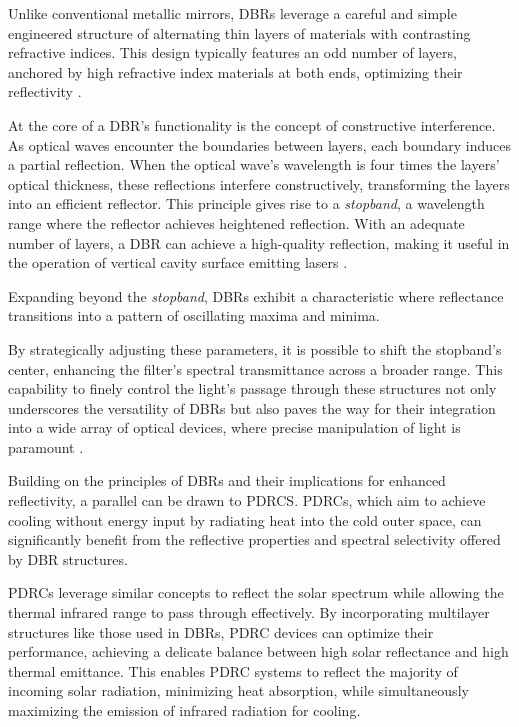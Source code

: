 Unlike conventional metallic mirrors, DBRs leverage a careful and simple engineered structure of alternating thin layers of materials with contrasting refractive indices. This design typically features an odd number of layers, anchored by high refractive index materials at both ends, optimizing their reflectivity \cite{multiphysics__distributed_nodate}.

At the core of a DBR's functionality is the concept of constructive interference. As optical waves encounter the boundaries between layers, each boundary induces a partial reflection. When the optical wave's wavelength is four times the layers' optical thickness, these reflections interfere constructively, transforming the layers into an efficient reflector. This principle gives rise to a \emph{stopband}, a wavelength range where the reflector achieves heightened reflection. With an adequate number of layers, a DBR can achieve a high-quality reflection, making it useful in the operation of vertical cavity surface emitting lasers \cite{multiphysics__distributed_nodate}.

Expanding beyond the \emph{stopband}, DBRs exhibit a characteristic where reflectance transitions into a pattern of oscillating maxima and minima.

By strategically adjusting these parameters, it is possible to shift the stopband's center, enhancing the filter's spectral transmittance across a broader range. This capability to finely control the light's passage through these structures not only underscores the versatility of DBRs but also paves the way for their integration into a wide array of optical devices, where precise manipulation of light is paramount \cite{pedrotti_introduction_2007}.

Building on the principles of DBRs and their implications for enhanced reflectivity, a parallel can be drawn to PDRCS. PDRCs, which aim to achieve cooling without energy input by radiating heat into the cold outer space, can significantly benefit from the reflective properties and spectral selectivity offered by DBR structures.

PDRCs leverage similar concepts to reflect the solar spectrum while allowing the thermal infrared range to pass through effectively. By incorporating multilayer structures like those used in DBRs, PDRC devices can optimize their performance, achieving a delicate balance between high solar reflectance and high thermal emittance. This enables PDRC systems to reflect the majority of incoming solar radiation, minimizing heat absorption, while simultaneously maximizing the emission of infrared radiation for cooling.

